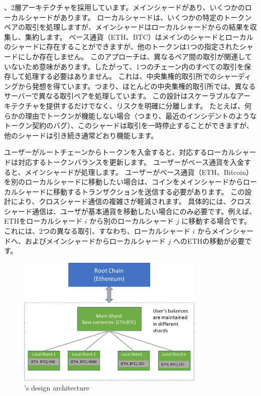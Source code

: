 、2層アーキテクチャを採用しています。メインシャードがあり、いくつかのローカルシャードがあります。 ローカルシャードは、いくつかの特定のトークンペアの取引を処理しますが、メインシャードはローカルシャードからの結果を収集し、集約します。 ベース通貨（ETH、BTC）はメインのシャードとローカルのシャードに存在することができますが、他のトークンは1つの指定されたシャードにしか存在しません。 このアプローチは、異なるペア間の取引が関連していないため意味があります。したがって、1つのチェーン内のすべての取引を保存して処理する必要はありません。 これは、中央集権的取引所でのシャーディングから発想を得ています。つまり、ほとんどの中央集権的取引所では、異なるサーバーで異なる取引ペアを処理しています。 この設計はスケーラブルなアーキテクチャを提供するだけでなく、リスクを明確に分離します。 たとえば、何らかの理由でトークンが機能しない場合（つまり、最近のインシデントのようなトークン契約のバグ）、このシャードは取引を一時停止することができますが、他のシャードは引き続き通常どおり機能します。

ユーザーがルートチェーンからトークンを入金すると、対応するローカルシャードは対応するトークンバランスを更新します。 ユーザーがベース通貨を入金すると、メインシャードが処理します。 ユーザーがベース通貨（ETH、Bitcoin）を別のローカルシャードに移動したい場合は、コインをメインシャードからローカルシャードに移動するトランザクションを送信する必要があります。 この設計により、クロスシャード通信の複雑さが軽減されます。 具体的には、クロスシャード通信は、ユーザが基本通貨を移動したい場合にのみ必要です。例えば、 ETHをローカルシャード $i$ から別のローカルシャード $j$ に移動する場合です。 これには、2つの異なる取引、すなわち、ローカルシャード $i$ からメインシャードへ、およびメインシャードからローカルシャード $j$ へのETHの移動が必要です。

\begin{figure}[t]
  \centering
  \includegraphics[width=0.8\textwidth]{images//architecture2}
  \caption{\codename's design architecture}
  \label{architecture2}
\end{figure}

